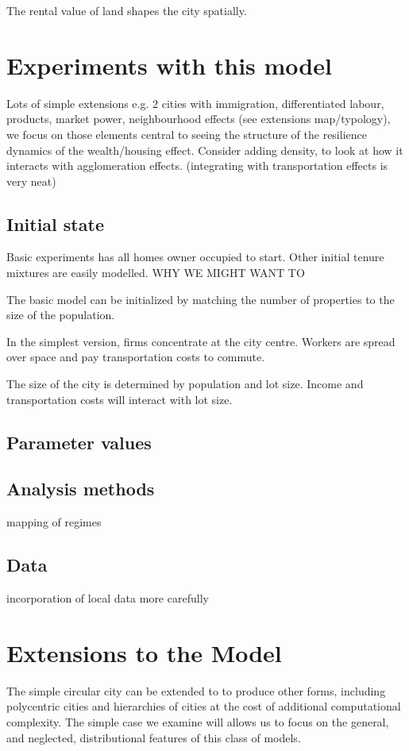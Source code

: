 The rental value of land shapes the city spatially.  

\section{Experiments with this model}
Lots of simple extensions e.g. 2 cities with immigration, differentiated labour, products, market power, neighbourhood effects (see extensions map/typology), we focus on those elements central to seeing the structure of the resilience dynamics of the wealth/housing effect. Consider adding density, to look at how it interacts with agglomeration effects. (integrating with transportation effects is very neat)

\subsection{Initial state}
Basic experiments has all homes owner occupied to start. Other initial tenure mixtures are easily modelled. WHY WE MIGHT WANT TO

The basic model can be initialized by matching the number of properties to the size of the population. 

In the simplest version, firms concentrate at the city centre. Workers are spread over space and pay transportation costs to commute.

The size of the city is determined by population and lot size. Income and transportation costs will interact with lot size. 

\subsection{Parameter values}

\subsection{Analysis methods}
mapping of regimes

\subsection{Data}
incorporation of local data more carefully

\section{Extensions to the Model}
The simple circular city can be extended to to produce other forms, including polycentric cities and hierarchies of cities at the cost of additional computational complexity. The simple case we examine will allows us to focus on the general, and neglected, distributional features of this class of models.

